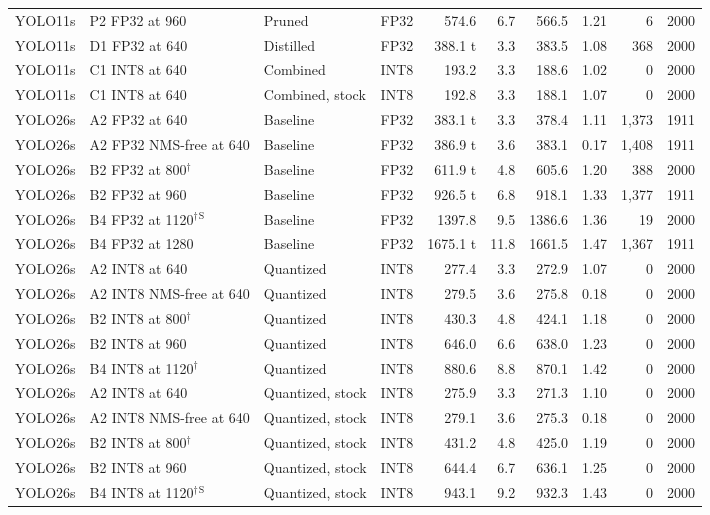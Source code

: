 \begin{longtable}{llllrrrrrr}
YOLO11s & P2 FP32 at 960 & Pruned & FP32 & 574.6 & 6.7 & 566.5 & 1.21 & 6 & 2000 \\
YOLO11s & D1 FP32 at 640 & Distilled & FP32 & 388.1 t & 3.3 & 383.5 & 1.08 & 368 & 2000 \\
YOLO11s & C1 INT8 at 640 & Combined & INT8 & 193.2 & 3.3 & 188.6 & 1.02 & 0 & 2000 \\
YOLO11s & C1 INT8 at 640 & Combined, stock & INT8 & 192.8 & 3.3 & 188.1 & 1.07 & 0 & 2000 \\
YOLO26s & A2 FP32 at 640 & Baseline & FP32 & 383.1 t & 3.3 & 378.4 & 1.11 & 1{,}373 & 1911 \\
YOLO26s & A2 FP32 NMS-free at 640 & Baseline & FP32 & 386.9 t & 3.6 & 383.1 & 0.17 & 1{,}408 & 1911 \\
YOLO26s & B2 FP32 at 800$^{\dagger}$ & Baseline & FP32 & 611.9 t & 4.8 & 605.6 & 1.20 & 388 & 2000 \\
YOLO26s & B2 FP32 at 960 & Baseline & FP32 & 926.5 t & 6.8 & 918.1 & 1.33 & 1{,}377 & 1911 \\
YOLO26s & B4 FP32 at 1120$^{\dagger}$$^{\mathrm{S}}$ & Baseline & FP32 & 1397.8 & 9.5 & 1386.6 & 1.36 & 19 & 2000 \\
YOLO26s & B4 FP32 at 1280 & Baseline & FP32 & 1675.1 t & 11.8 & 1661.5 & 1.47 & 1{,}367 & 1911 \\
YOLO26s & A2 INT8 at 640 & Quantized & INT8 & 277.4 & 3.3 & 272.9 & 1.07 & 0 & 2000 \\
YOLO26s & A2 INT8 NMS-free at 640 & Quantized & INT8 & 279.5 & 3.6 & 275.8 & 0.18 & 0 & 2000 \\
YOLO26s & B2 INT8 at 800$^{\dagger}$ & Quantized & INT8 & 430.3 & 4.8 & 424.1 & 1.18 & 0 & 2000 \\
YOLO26s & B2 INT8 at 960 & Quantized & INT8 & 646.0 & 6.6 & 638.0 & 1.23 & 0 & 2000 \\
YOLO26s & B4 INT8 at 1120$^{\dagger}$ & Quantized & INT8 & 880.6 & 8.8 & 870.1 & 1.42 & 0 & 2000 \\
YOLO26s & A2 INT8 at 640 & Quantized, stock & INT8 & 275.9 & 3.3 & 271.3 & 1.10 & 0 & 2000 \\
YOLO26s & A2 INT8 NMS-free at 640 & Quantized, stock & INT8 & 279.1 & 3.6 & 275.3 & 0.18 & 0 & 2000 \\
YOLO26s & B2 INT8 at 800$^{\dagger}$ & Quantized, stock & INT8 & 431.2 & 4.8 & 425.0 & 1.19 & 0 & 2000 \\
YOLO26s & B2 INT8 at 960 & Quantized, stock & INT8 & 644.4 & 6.7 & 636.1 & 1.25 & 0 & 2000 \\
YOLO26s & B4 INT8 at 1120$^{\dagger}$$^{\mathrm{S}}$ & Quantized, stock & INT8 & 943.1 & 9.2 & 932.3 & 1.43 & 0 & 2000 \\

\end{longtable}
